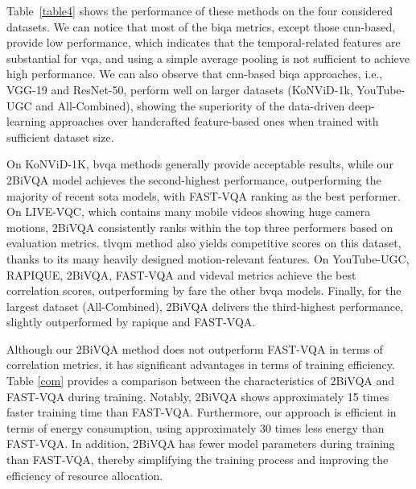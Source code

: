 \documentclass[journal]{IEEEtran}
\begin{document}
Table~\ref{table4} shows the performance of these methods on the four considered datasets. We can notice that most of the \ac{biqa} metrics, except those \ac{cnn}-based, provide low performance, which indicates that the temporal-related features are substantial for \ac{vqa}, and using a simple average pooling is not sufficient to achieve high performance. We can also observe that \ac{cnn}-based \ac{biqa} approaches, i.e., VGG-19 and ResNet-50, perform well on larger datasets (KoNViD-1k, YouTube-UGC and All-Combined), showing the superiority of the data-driven deep-learning approaches over handcrafted feature-based ones when trained with sufficient dataset size.


On KoNViD-1K, \ac{bvqa} methods generally provide acceptable results, while our 2BiVQA model achieves the second-highest performance, outperforming the majority of recent \ac{sota} models, with FAST-VQA ranking as the best performer. On LIVE-VQC, which contains many mobile videos showing huge camera motions, 2BiVQA consistently ranks within the top three performers based on evaluation metrics. \ac{tlvqm} method also yields competitive scores on this dataset, thanks to its many heavily designed motion-relevant features. On YouTube-UGC, RAPIQUE, 2BiVQA, FAST-VQA and \ac{videval} metrics achieve the best correlation scores, outperforming by fare the other \ac{bvqa} models. Finally, for the largest dataset (All-Combined), 2BiVQA delivers the third-highest performance, slightly outperformed by \ac{rapique} and FAST-VQA.


Although our 2BiVQA method does not outperform FAST-VQA in terms of correlation metrics, it has significant advantages in terms of training efficiency. Table \ref{com} provides a comparison between the characteristics of 2BiVQA and FAST-VQA  during training. Notably, 2BiVQA shows approximately 15 times faster training time than FAST-VQA.  Furthermore, our approach is efficient in terms of energy consumption, using approximately 30 times less energy than FAST-VQA. In addition, 2BiVQA has fewer model parameters during training than FAST-VQA, thereby simplifying the training process and improving the efficiency of resource allocation.
\end{document}
